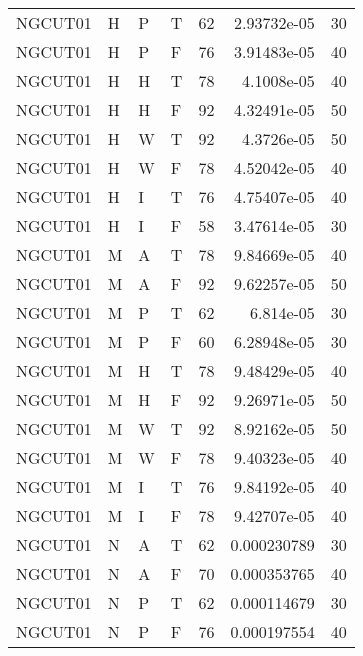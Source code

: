 \begin{longtable}{llllrrr}
    NGCUT01  & H     & P     & T          & 62         & 2.93732e-05 & 30       \\
    NGCUT01  & H     & P     & F          & 76         & 3.91483e-05 & 40       \\
    NGCUT01  & H     & H     & T          & 78         & 4.1008e-05  & 40       \\
    NGCUT01  & H     & H     & F          & 92         & 4.32491e-05 & 50       \\
    NGCUT01  & H     & W     & T          & 92         & 4.3726e-05  & 50       \\
    NGCUT01  & H     & W     & F          & 78         & 4.52042e-05 & 40       \\
    NGCUT01  & H     & I     & T          & 76         & 4.75407e-05 & 40       \\
    NGCUT01  & H     & I     & F          & 58         & 3.47614e-05 & 30       \\
    NGCUT01  & M     & A     & T          & 78         & 9.84669e-05 & 40       \\
    NGCUT01  & M     & A     & F          & 92         & 9.62257e-05 & 50       \\
    NGCUT01  & M     & P     & T          & 62         & 6.814e-05   & 30       \\
    NGCUT01  & M     & P     & F          & 60         & 6.28948e-05 & 30       \\
    NGCUT01  & M     & H     & T          & 78         & 9.48429e-05 & 40       \\
    NGCUT01  & M     & H     & F          & 92         & 9.26971e-05 & 50       \\
    NGCUT01  & M     & W     & T          & 92         & 8.92162e-05 & 50       \\
    NGCUT01  & M     & W     & F          & 78         & 9.40323e-05 & 40       \\
    NGCUT01  & M     & I     & T          & 76         & 9.84192e-05 & 40       \\
    NGCUT01  & M     & I     & F          & 78         & 9.42707e-05 & 40       \\
    NGCUT01  & N     & A     & T          & 62         & 0.000230789 & 30       \\
    NGCUT01  & N     & A     & F          & 70         & 0.000353765 & 40       \\
    NGCUT01  & N     & P     & T          & 62         & 0.000114679 & 30       \\
    NGCUT01  & N     & P     & F          & 76         & 0.000197554 & 40       \\

\end{longtable}
